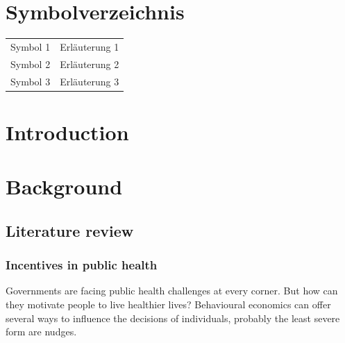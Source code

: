 \documentclass{scrbook}
\begin{document}
\listoffigures

\listoftables

\chapter*{Symbolverzeichnis}\label{sv}
\begin{tabular}{ll}
Symbol 1 & Erläuterung 1 \\
Symbol 2 & Erläuterung 2\\
Symbol 3 & Erläuterung 3\\
\end{tabular}
 
\mainmatter

\chapter{Introduction}

\newpage\null\thispagestyle{empty}\newpage

\chapter{Background}

\section{Literature review}

\subsection{Incentives in public health}

Governments are facing public health challenges at every corner. But how
can they motivate people to live healthier lives? Behavioural economics
can offer several ways to influence the decisions of individuals,
probably the least severe form are nudges.
\end{document}
